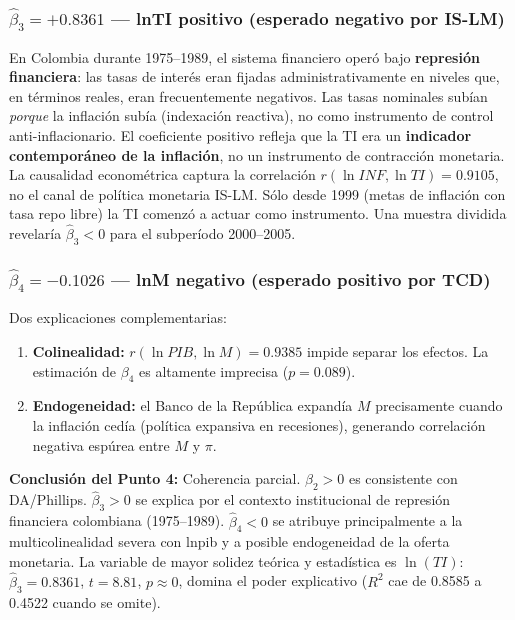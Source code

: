 \documentclass[12pt,a4paper]{article}
\begin{document}
\subsubsection{$\hat\beta_3=+0.8361$ --- lnTI positivo (esperado negativo por IS-LM)}

En Colombia durante 1975--1989, el sistema financiero operó bajo
\textbf{represión financiera}: las tasas de interés eran fijadas
administrativamente en niveles que, en términos reales, eran frecuentemente
negativos. Las tasas nominales subían \textit{porque} la inflación subía
(indexación reactiva), no como instrumento de control anti-inflacionario.
El coeficiente positivo refleja que la TI era un \textbf{indicador contemporáneo
de la inflación}, no un instrumento de contracción monetaria. La causalidad
econométrica captura la correlación $r(\ln INF,\ln TI)=0.9105$, no el canal de
política monetaria IS-LM. Sólo desde 1999 (metas de inflación con tasa repo
libre) la TI comenzó a actuar como instrumento. Una muestra dividida revelaría
$\hat\beta_3<0$ para el subperíodo 2000--2005.

\subsubsection{$\hat\beta_4=-0.1026$ --- lnM negativo (esperado positivo por TCD)}

Dos explicaciones complementarias:
\begin{enumerate}[noitemsep]
  \item \textbf{Colinealidad:} $r(\ln PIB,\ln M)=0.9385$ impide separar los
        efectos. La estimación de $\beta_4$ es altamente imprecisa ($p=0.089$).
  \item \textbf{Endogeneidad:} el Banco de la República expandía $M$
        precisamente cuando la inflación cedía (política expansiva en
        recesiones), generando correlación negativa espúrea entre $M$ y $\pi$.
\end{enumerate}

\begin{resbox}
\textbf{Conclusión del Punto 4:} Coherencia parcial. $\hat\beta_2>0$ es
consistente con DA/Phillips. $\hat\beta_3>0$ se explica por el contexto
institucional de represión financiera colombiana (1975--1989). $\hat\beta_4<0$
se atribuye principalmente a la multicolinealidad severa con lnpib y a posible
endogeneidad de la oferta monetaria. La variable de mayor solidez teórica y
estadística es $\ln(TI)$: $\hat\beta_3=0.8361$, $t=8.81$, $p\approx0$, domina
el poder explicativo ($R^2$ cae de 0.8585 a 0.4522 cuando se omite).
\end{resbox}
\end{document}
